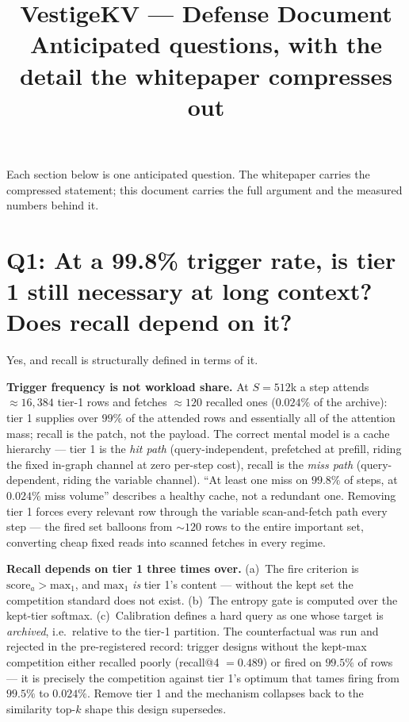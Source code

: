 \documentclass[11pt]{article}
\title{VestigeKV --- Defense Document\\{\large Anticipated questions, with the
detail the whitepaper compresses out}}
\date{}
\begin{document}
\maketitle

\noindent Each section below is one anticipated question. The whitepaper
carries the compressed statement; this document carries the full argument
and the measured numbers behind it.

\section{Q1: At a 99.8\% trigger rate, is tier 1 still necessary at long
context? Does recall depend on it?}

Yes, and recall is structurally defined in terms of it.

\textbf{Trigger frequency is not workload share.} At $S{=}512$k a step
attends $\approx\!16{,}384$ tier-1 rows and fetches $\approx\!120$ recalled
ones ($0.024\%$ of the archive): tier 1 supplies over $99\%$ of the attended
rows and essentially all of the attention mass; recall is the patch, not the
payload. The correct mental model is a cache hierarchy --- tier 1 is the
\emph{hit path} (query-independent, prefetched at prefill, riding the fixed
in-graph channel at zero per-step cost), recall is the \emph{miss path}
(query-dependent, riding the variable channel). ``At least one miss on
$99.8\%$ of steps, at $0.024\%$ miss volume'' describes a healthy cache, not
a redundant one. Removing tier 1 forces every relevant row through the
variable scan-and-fetch path every step --- the fired set balloons from
${\sim}120$ rows to the entire important set, converting cheap fixed reads
into scanned fetches in every regime.

\textbf{Recall depends on tier 1 three times over.} (a)~The fire criterion
is $\mathrm{score}_a > \mathrm{max}_1$, and $\mathrm{max}_1$ \emph{is} tier
1's content --- without the kept set the competition standard does not
exist. (b)~The entropy gate is computed over the kept-tier softmax.
(c)~Calibration defines a hard query as one whose target is \emph{archived},
i.e.\ relative to the tier-1 partition. The counterfactual was run and
rejected in the pre-registered record: trigger designs without the kept-max
competition either recalled poorly (recall@4 $=0.489$) or fired on $99.5\%$
of rows --- it is precisely the competition against tier 1's optimum that
tames firing from $99.5\%$ to $0.024\%$. Remove tier 1 and the mechanism
collapses back to the similarity top-$k$ shape this design supersedes.
\end{document}
